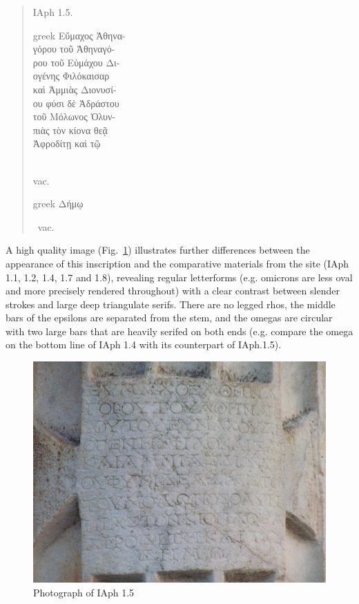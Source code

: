 \documentclass[amsthm,ebook]{saparticle}
\begin{document}
\begin{quotation}
\noindent IAph 1.5.\\
\begin{otherlanguage*}{greek}
\noindent Εὔμαχος Ἀθηνα-\\
γόρου τοῦ Ἀθηναγό-\\
ρου τοῦ Εὐμάχου Δι-\\
ογένης Φιλόκαισαρ\\
 καὶ Ἀμμιὰς Διονυσί-\\
ου φύσι δὲ Ἀδράστου\\
τοῦ Μόλωνος Ὀλυν-\\
πιὰς τὸν κίονα θεᾷ\\
Ἀφροδίτῃ καὶ τῷ
\end{otherlanguage*} \\
vac. \begin{otherlanguage*}{greek}
Δήμῳ
\end{otherlanguage*} vac.
\end{quotation}



A high quality image (Fig.~\ref{fig:3}) illustrates further differences between the appearance of this inscription
and the comparative materials from the site (IAph 1.1, 1.2, 1.4, 1.7 and 1.8), revealing regular letterforms (e.g. omicrons are less oval and more precisely rendered
throughout) with a clear contrast between slender strokes and large deep triangulate serifs. There are no legged rhos,
the middle bars of the epsilons are separated from the stem, and the omegas are circular with two large bars that are
heavily serifed on both ends (e.g. compare the omega on the bottom line of IAph 1.4 with its counterpart of IAph.1.5).

\newpage

\begin{figure}[!hbp]
\centering
 \includegraphics[width=\columnwidth]{PaperproposalforEAGLEfinal-img003.jpg}
\caption{Photograph of IAph 1.5}
\label{fig:3}
\end{figure}
\end{document}
